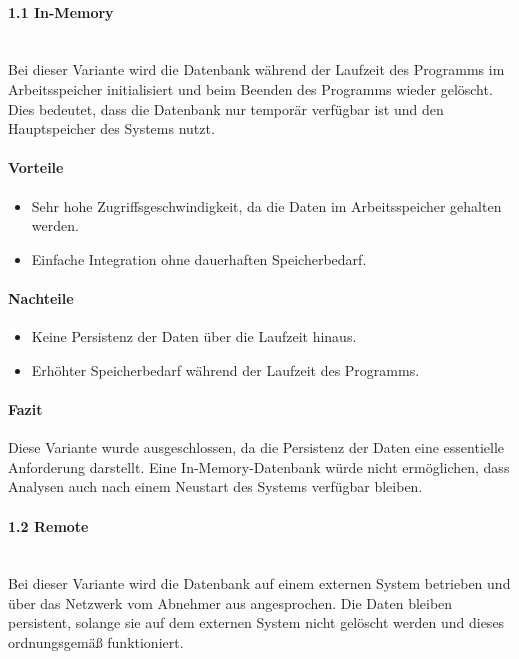 \documentclass[a4paper,12pt]{report}
\begin{document}
    \paragraph{1.1 In-Memory}\mbox{}\\
    Bei dieser Variante wird die Datenbank während der Laufzeit des Programms im Arbeitsspeicher initialisiert und beim Beenden des Programms wieder gelöscht.
    Dies bedeutet, dass die Datenbank nur temporär verfügbar ist und den Hauptspeicher des Systems nutzt.

    \paragraph{Vorteile}
    \begin{itemize}
        \item Sehr hohe Zugriffsgeschwindigkeit, da die Daten im Arbeitsspeicher gehalten werden.
        \item Einfache Integration ohne dauerhaften Speicherbedarf.
    \end{itemize}

    \paragraph{Nachteile}
    \begin{itemize}
        \item Keine Persistenz der Daten über die Laufzeit hinaus.
        \item Erhöhter Speicherbedarf während der Laufzeit des Programms.
    \end{itemize}

    \paragraph{Fazit}
    Diese Variante wurde ausgeschlossen, da die Persistenz der Daten eine essentielle Anforderung darstellt.
    Eine In-Memory-Datenbank würde nicht ermöglichen, dass Analysen auch nach einem Neustart des Systems verfügbar bleiben.

    \paragraph{1.2 Remote}\mbox{}\\
    Bei dieser Variante wird die Datenbank auf einem externen System betrieben und über das Netzwerk vom Abnehmer aus angesprochen.
    Die Daten bleiben persistent, solange sie auf dem externen System nicht gelöscht werden und dieses ordnungsgemäß funktioniert.
\end{document}
